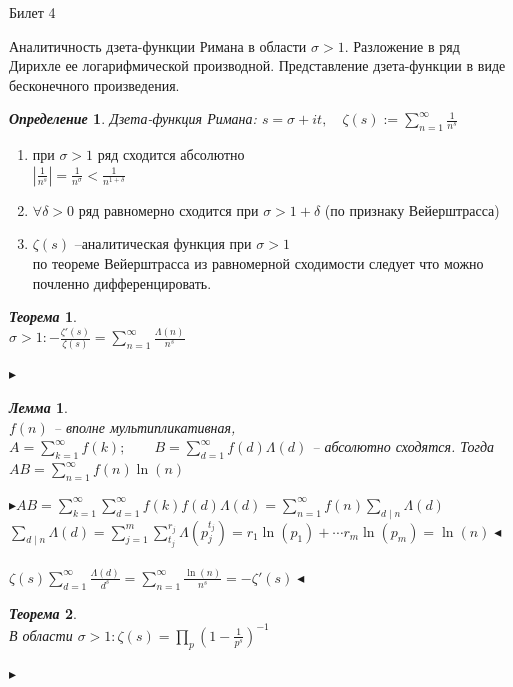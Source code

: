 \documentclass[a4paper,12pt]{article}
\newtheorem{deff}{\textit{Определение}}
\newtheorem{teo}{\textit{Теорема}}
\newtheorem{lem}{\textit{Лемма}}
\newcommand{\q}{\quad}
\newcommand{\pb}{\blacktriangleright}
\newcommand{\pe}{\blacktriangleleft}
\newcommand{\SL}{\sum\limits}
\begin{document}
\newpage
\begin{mybox2}{\hypertarget{bil4}{Билет 4}}

\begin{formbox}{}
Аналитичность дзета-функции Римана в области $\sigma > 1$. Разложение в ряд Дирихле ее логарифмической производной. Представление дзета-функции в виде бесконечного произведения.
\end{formbox}
\begin{formbox}{}
\begin{deff}
Дзета-функция Римана: $s = \sigma + it, \q\zeta (s) := \SL_{n=1}^\infty \frac{1}{n^s}$
\end{deff}
\end{formbox}
\begin{enumerate}
    \item при $\sigma > 1$ ряд сходится абсолютно \\
    $\left|\frac{1}{n^s}\right| = \frac{1}{n^\sigma}<\frac{1}{n^{1 + \delta}}$
    \item $\forall \delta > 0$ ряд равномерно сходится при $\sigma>1+\delta$ (по признаку Вейерштрасса)
    \item $\zeta(s)$ --аналитическая функция при $\sigma > 1$\\
    по теореме Вейерштрасса из равномерной сходимости следует что можно почленно дифференцировать.
\end{enumerate}

\begin{formbox}{}
\begin{teo}\q\\
$\sigma > 1: -\frac{\zeta'(s)}{\zeta(s)} = \SL_{n=1}^\infty \frac{\Lambda(n)}{n^s} $
\end{teo}
\end{formbox}
$\pb$

\begin{formbox}{}
\begin{lem}\q\\
$f(n)$ -- вполне мультипликативная, $A = \SL_{k=1}^\infty f(k);\q\q B = \SL_{d=1}^\infty f(d)\Lambda(d)$ -- абсолютно сходятся. Тогда $AB = \SL_{n=1}^\infty f(n) \ln(n)$
\end{lem}
\end{formbox}
$\pb AB = \SL_{k=1}^\infty \SL_{d=1}^\infty f(k)f(d)\Lambda(d) = \SL_{n=1}^\infty f(n) \SL_{d\mid n} \Lambda(d)$\\
$\SL_{d\mid n} \Lambda(d) = \SL_{j=1}^m\SL_{t_j}^{r_j} \Lambda(p_j^{t_j}) = r_1 \ln(p_1) + \cdots r_m \ln(p_m) = \ln(n) \pe$\\\q\\
$\zeta(s) \SL_{d=1}^\infty\frac{\Lambda(d)}{d^s} = \SL_{n=1}^\infty \frac{\ln(n)}{n^s} = -\zeta'(s) \pe$

\begin{formbox}{}
\begin{teo}\q\\
В области $\sigma > 1: \zeta(s) = \prod\limits_p (1 - \frac{1}{p^s})^{-1}$
\end{teo}
\end{formbox}
$\pb$
\end{mybox2}
\end{document}
